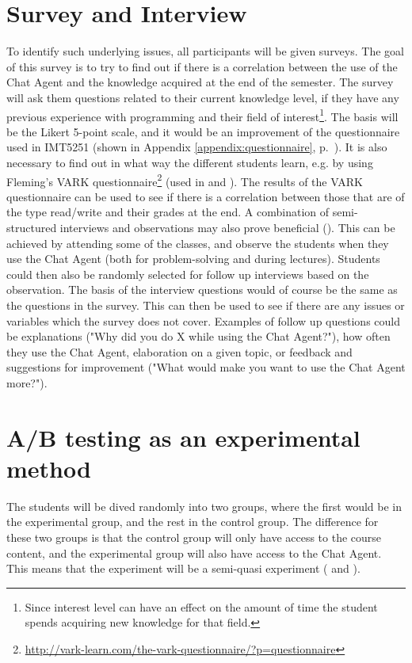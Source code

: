 \section{Survey and Interview}
\label{chapter4:survey_and_interview}
To identify such underlying issues, all participants will be given surveys. The goal of this survey is to try to find out if there is a correlation between the use of the 
Chat Agent and the knowledge acquired at the end of the semester. The survey will ask them questions related to their current knowledge level, if they have any previous 
experience with programming and their field of interest\footnote{Since interest level can have an effect on the amount of time the student spends acquiring new knowledge 
	for that field.}. The basis will be the Likert 5-point scale, and it would be an improvement of the questionnaire used in IMT5251 (shown in Appendix \ref{appendix:questionnaire}, 
p.~\pageref{appendix:questionnaire}). It is also necessary to find out in what way the different students learn, e.g. by using Fleming's VARK 
 questionnaire\footnote{\url{http://vark-learn.com/the-vark-questionnaire/?p=questionnaire}} (used in \citet[p.~152]{Kowalski2013} and \citet{Sarabdeen2013}). 
The results of the VARK questionnaire can be used to see if there is a correlation between those that are of the type read/write and their grades at the end.
\newpage\noindent
A combination of semi-structured interviews and observations may also prove beneficial (\citet{Fincher2011}). This can be achieved by attending some of the classes, and 
observe the students when they use the Chat Agent (both for problem-solving and during lectures). Students could then also be randomly selected for follow up interviews 
based on the observation. The basis of the interview questions would of course be the same as the questions in the survey. This can then be used to see if there are any 
issues or variables which the survey does not cover. Examples of follow up questions could be explanations ("Why did you do X while using the Chat Agent?"), how often 
they use the Chat Agent, elaboration on a given topic, or feedback and suggestions for improvement ("What would make you want to use the Chat Agent more?"). 

\section{A/B testing as an experimental method}
\label{chapter4:ab_testing_experimental}
The students will be dived randomly into two groups, where the first would be in the experimental group, and the rest in the control group. The difference for these two 
groups is that the control group will only have access to the course content, and the experimental group will also have access to the Chat Agent. This means that the experiment 
will be a semi-quasi experiment (\citet[p.~226-248]{Leedy2012} and \citet[p.~114-115]{Ringdal2007}).

